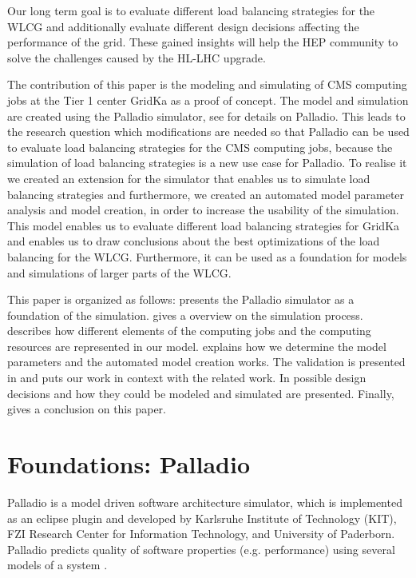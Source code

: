 \documentclass[a4paper]{jpconf}
\begin{document}
Our long term goal is to evaluate different load balancing strategies for the WLCG and additionally evaluate different design decisions affecting the performance of the grid. These gained insights will help the HEP community to solve the challenges caused by the HL-LHC upgrade.

The contribution of this paper is the modeling and simulating of CMS computing jobs at the Tier 1 center GridKa as a proof of concept.
The model and simulation are created using the Palladio simulator, see  for details on Palladio. This leads to the research question which modifications are needed so that Palladio can be used to evaluate load balancing strategies for the CMS computing jobs, because the simulation of load balancing strategies is a new use case for Palladio. To realise it we created an extension for the simulator that enables us to simulate load balancing strategies and furthermore, we created an automated model parameter analysis and model creation, in order to increase the usability of the simulation.
This model enables us to evaluate different load balancing strategies for GridKa and enables us to draw conclusions about the best optimizations of the load balancing for the WLCG. Furthermore, it can be used as a foundation for models and simulations of larger parts of the WLCG.


This paper is organized as follows:  presents the Palladio simulator as a foundation of the simulation.  gives a overview on the simulation process.  describes how different elements of the computing jobs and the computing resources are represented in our model.  explains how we determine the model parameters and the automated model creation works. The validation is presented in  and  puts our work in context with the related work. In  possible design decisions and how they could be modeled and simulated are presented. Finally,  gives a conclusion on this paper.


\section{Foundations: Palladio}
\label{sec:palladio}
Palladio is a model driven software architecture simulator, which is implemented as an eclipse plugin and developed by Karlsruhe Institute of Technology (KIT), FZI Research Center for Information Technology, and University of Paderborn. Palladio predicts quality of software properties (e.g. performance) using several models of a system \cite{BECKER20093}.
\end{document}
